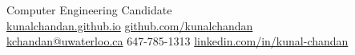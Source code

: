 \documentclass[]{chandan-cv}
\begin{document}
%
%

%
%
{ 
Computer Engineering Candidate \\
\href{http://kunalchandan.github.io}{kunalchandan.github.io}
\hfill
\href{http://github.com/kunalchandan}{github.com/kunalchandan}\\
\href{mailto:kchandan@uwaterloo.ca}{kchandan@uwaterloo.ca}
\hfill
647-785-1313
\hfill 
\href{https://www.linkedin.com/in/kunal-chandan/}{linkedin.com/in/kunal-chandan}
}

%
%
\end{document}
